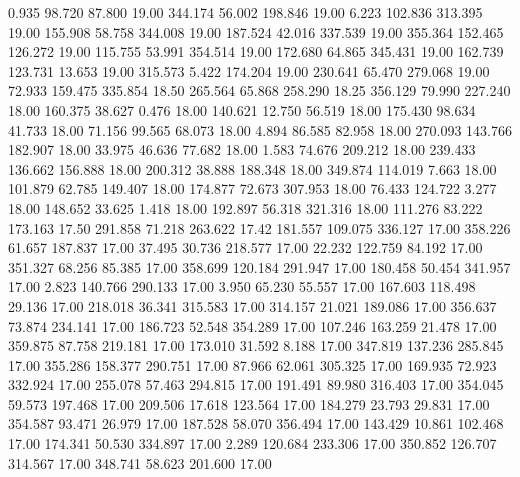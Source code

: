    0.935   98.720   87.800        19.00
 344.174   56.002  198.846        19.00
   6.223  102.836  313.395        19.00
 155.908   58.758  344.008        19.00
 187.524   42.016  337.539        19.00
 355.364  152.465  126.272        19.00
 115.755   53.991  354.514        19.00
 172.680   64.865  345.431        19.00
 162.739  123.731   13.653        19.00
 315.573    5.422  174.204        19.00
 230.641   65.470  279.068        19.00
  72.933  159.475  335.854        18.50
 265.564   65.868  258.290        18.25
 356.129   79.990  227.240        18.00
 160.375   38.627    0.476        18.00
 140.621   12.750   56.519        18.00
 175.430   98.634   41.733        18.00
  71.156   99.565   68.073        18.00
   4.894   86.585   82.958        18.00
 270.093  143.766  182.907        18.00
  33.975   46.636   77.682        18.00
   1.583   74.676  209.212        18.00
 239.433  136.662  156.888        18.00
 200.312   38.888  188.348        18.00
 349.874  114.019    7.663        18.00
 101.879   62.785  149.407        18.00
 174.877   72.673  307.953        18.00
  76.433  124.722    3.277        18.00
 148.652   33.625    1.418        18.00
 192.897   56.318  321.316        18.00
 111.276   83.222  173.163        17.50
 291.858   71.218  263.622        17.42
 181.557  109.075  336.127        17.00
 358.226   61.657  187.837        17.00
  37.495   30.736  218.577        17.00
  22.232  122.759   84.192        17.00
 351.327   68.256   85.385        17.00
 358.699  120.184  291.947        17.00
 180.458   50.454  341.957        17.00
   2.823  140.766  290.133        17.00
   3.950   65.230   55.557        17.00
 167.603  118.498   29.136        17.00
 218.018   36.341  315.583        17.00
 314.157   21.021  189.086        17.00
 356.637   73.874  234.141        17.00
 186.723   52.548  354.289        17.00
 107.246  163.259   21.478        17.00
 359.875   87.758  219.181        17.00
 173.010   31.592    8.188        17.00
 347.819  137.236  285.845        17.00
 355.286  158.377  290.751        17.00
  87.966   62.061  305.325        17.00
 169.935   72.923  332.924        17.00
 255.078   57.463  294.815        17.00
 191.491   89.980  316.403        17.00
 354.045   59.573  197.468        17.00
 209.506   17.618  123.564        17.00
 184.279   23.793   29.831        17.00
 354.587   93.471   26.979        17.00
 187.528   58.070  356.494        17.00
 143.429   10.861  102.468        17.00
 174.341   50.530  334.897        17.00
   2.289  120.684  233.306        17.00
 350.852  126.707  314.567        17.00
 348.741   58.623  201.600        17.00
